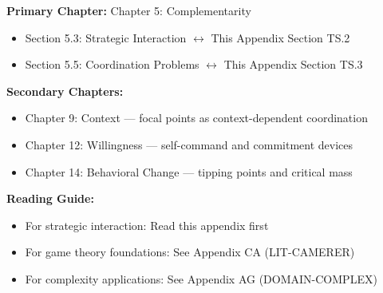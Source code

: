 %
%

%
%
%
%

\begin{tcolorbox}[colback=purple!5!white, colframe=purple!75!black,
    title=Chapter Linkage]

\textbf{Primary Chapter:} Chapter 5: Complementarity
\begin{itemize}[nosep]
\item Section 5.3: Strategic Interaction $\leftrightarrow$ This Appendix Section TS.2
\item Section 5.5: Coordination Problems $\leftrightarrow$ This Appendix Section TS.3
\end{itemize}

\textbf{Secondary Chapters:}
\begin{itemize}[nosep]
\item Chapter 9: Context --- focal points as context-dependent coordination
\item Chapter 12: Willingness --- self-command and commitment devices
\item Chapter 14: Behavioral Change --- tipping points and critical mass
\end{itemize}

\textbf{Reading Guide:}
\begin{itemize}[nosep]
\item For strategic interaction: Read this appendix first
\item For game theory foundations: See Appendix CA (LIT-CAMERER)
\item For complexity applications: See Appendix AG (DOMAIN-COMPLEX)
\end{itemize}

\end{tcolorbox}

